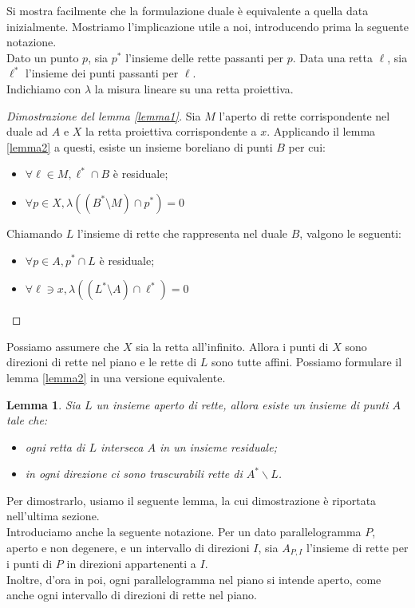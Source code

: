\documentclass[a4paper, twoside,openright]{article}
\newcommand{\fa}{\forall}
\newcommand{\<}{\langle}
\renewcommand{\>}{\rangle}
\newtheorem{lemma}[teo]{Lemma}
\begin{document}
	Si mostra facilmente che la formulazione duale è equivalente a quella data inizialmente. Mostriamo l'implicazione utile a noi, introducendo prima la seguente notazione.\\
	Dato un punto $p$, sia $p^*$ l'insieme delle rette passanti per $p$. Data una retta $\ell$, sia $\ell^*$ l'insieme dei punti passanti per $\ell$.\\
	Indichiamo con $\lambda$ la misura lineare su una retta proiettiva.
	
\begin{proof} [Dimostrazione del lemma \ref{lemma1}]
	Sia $M$ l'aperto di rette corrispondente nel duale ad $A$ e $X$ la retta proiettiva corrispondente a $x$. Applicando il lemma \ref{lemma2} a questi, esiste un insieme boreliano di punti $B$ per cui:
	\begin{itemize}
		\item $\fa \ell \in M, \ell^* \cap B$ è residuale;
		\item $\fa p \in X, \lambda((B^* \setminus M) \cap p^*)=0$
	\end{itemize}
	Chiamando $L$ l'insieme di rette che rappresenta nel duale $B$, valgono le seguenti:
	\begin{itemize}
		\item 	$\fa p \in A, p^* \cap L$ è residuale;
		\item 	$\fa \ell \ni x, \lambda((L^* \setminus A) \cap \ell^*)=0$
	\end{itemize}
\end{proof}

Possiamo assumere che $X$ sia la retta all'infinito. Allora i punti di $X$ sono direzioni di rette nel piano e le rette di $L$ sono tutte affini. Possiamo formulare il lemma \ref{lemma2} in una versione equivalente.

\begin{lemma} \label{lemma2bello}
Sia $L$ un insieme aperto di rette, allora esiste un insieme di punti $A$ tale che:
\begin{itemize}
	\item ogni retta di $L$ interseca $A$ in un insieme residuale;
	\item in ogni direzione ci sono trascurabili rette di  $A^{*} \backslash L$.
\end{itemize}
\end{lemma}

Per dimostrarlo, usiamo il seguente lemma, la cui dimostrazione è riportata nell'ultima sezione.\\
Introduciamo anche la seguente notazione. Per un dato parallelogramma $P$, aperto e non degenere, e un intervallo di direzioni $I$, sia $A_{P, I}$ l'insieme di rette per i punti di $P$ in direzioni appartenenti a $I$.\\
Inoltre, d'ora in poi, ogni parallelogramma nel piano si intende aperto, come anche ogni intervallo di direzioni di rette nel piano.
\end{document}
